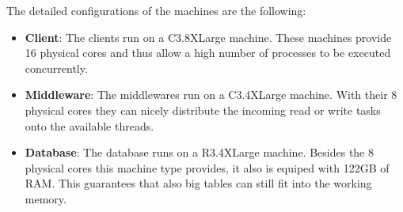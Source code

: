 \documentclass[11pt]{article}
\begin{document}
The detailed configurations of the machines are the following:
\begin{itemize}
	\item \textbf{Client}: The clients run on a C3.8XLarge machine. These machines provide 16 physical cores and thus allow a high number of processes to be executed concurrently.
	\item \textbf{Middleware}: The middlewares run on a C3.4XLarge machine. With their 8 physical cores they can nicely distribute the incoming read or write tasks onto the available threads.
	\item \textbf{Database}: The database runs on a R3.4XLarge machine. Besides the 8 physical cores this machine type provides, it also is equiped with 122GB of RAM. This guarantees that also big tables can still fit into the working memory.
\end{itemize}
\end{document}

